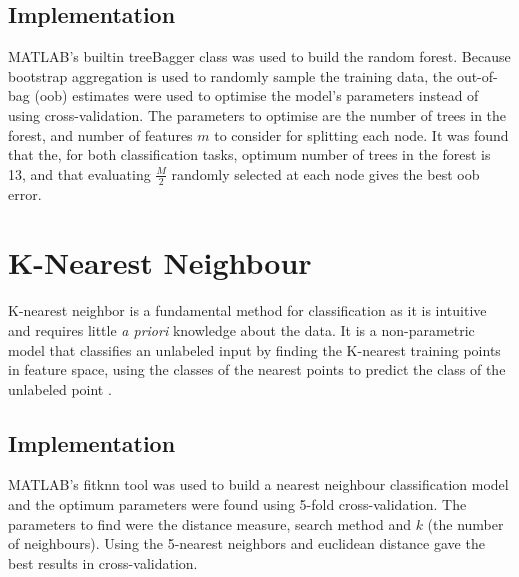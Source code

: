 \subsection{Implementation}

MATLAB's builtin treeBagger class was used to build the random forest. Because bootstrap aggregation is used to randomly sample the training data, the out-of-bag (oob) estimates were used to optimise the model's parameters instead of using cross-validation. The parameters to optimise are the number of trees in the forest, and number of features $m$ to consider for splitting each node. It was found that the, for both classification tasks, optimum number of trees in the forest is 13, and that evaluating $\frac{M}{2}$ randomly selected at each node gives the best oob error.

\section{K-Nearest Neighbour}

K-nearest neighbor is a fundamental method for classification as it is intuitive and requires little \textit{a priori} knowledge about the data. It is a non-parametric model that classifies an unlabeled input by finding the K-nearest training points in feature space, using the classes of the nearest points to predict the class of the unlabeled point \cite{Peterson}. 

\subsection{Implementation}

MATLAB's fitknn tool was used to build a nearest neighbour classification model and the optimum parameters were found using 5-fold cross-validation. The parameters to find were the distance measure, search method and $k$ (the number of neighbours). Using the 5-nearest neighbors and euclidean distance gave the best results in cross-validation.

